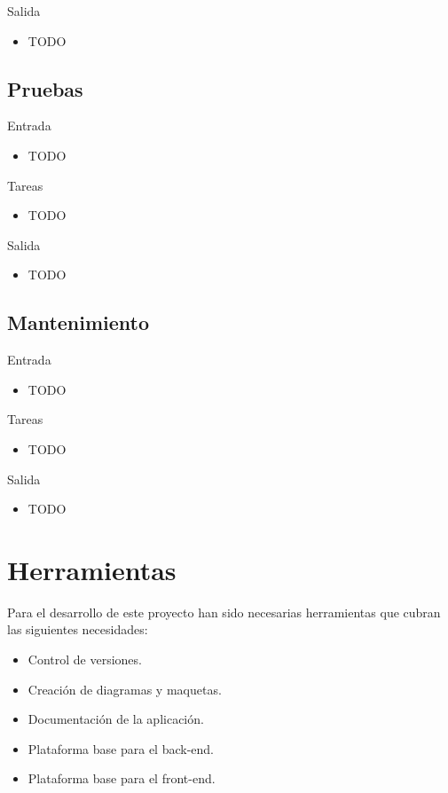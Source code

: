 Salida
\begin{itemize}[leftmargin=3.5em]
  \item TODO
\end{itemize}

\subsection*{Pruebas\label{ssec:dp:pruebas}}

Entrada
\begin{itemize}[leftmargin=3.5em]
  \item TODO
\end{itemize}

Tareas
\begin{itemize}[leftmargin=3.5em]
  \item TODO
\end{itemize}

Salida
\begin{itemize}[leftmargin=3.5em]
  \item TODO
\end{itemize}

\subsection*{Mantenimiento\label{ssec:dp:mantenimiento}}

Entrada
\begin{itemize}[leftmargin=3.5em]
  \item TODO
\end{itemize}

Tareas
\begin{itemize}[leftmargin=3.5em]
  \item TODO
\end{itemize}

Salida
\begin{itemize}[leftmargin=3.5em]
  \item TODO
\end{itemize}


\section{Herramientas\label{sec:dp:herramientas}}

Para el desarrollo de este proyecto han sido necesarias herramientas que cubran las siguientes necesidades:

\begin{itemize}
  \item Control de versiones.
  \item Creación de diagramas y maquetas.
  \item Documentación de la aplicación.
  \item Plataforma base para el \gls{back-end}.
  \item Plataforma base para el \gls{front-end}.
\end{itemize}

